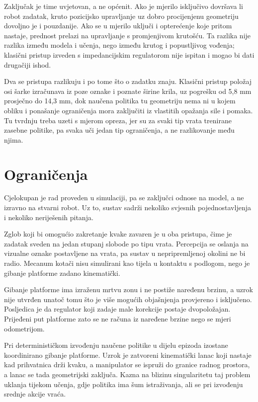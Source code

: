 Zaključak je time uvjetovan, a ne općenit. Ako je mjerilo isključivo dovršava li robot zadatak,
kruto pozicijsko upravljanje uz dobro procijenjenu geometriju dovoljno je i pouzdanije. Ako se u
mjerilo uključi i opterećenje koje pritom nastaje, prednost prelazi na upravljanje s promjenjivom
krutošću. Ta razlika nije razlika između modela i učenja, nego između krutog i popustljivog
vođenja; klasični pristup izveden s impedancijskim regulatorom nije ispitan i mogao bi dati
drugačiji ishod.

Dva se pristupa razlikuju i po tome što o zadatku znaju. Klasični pristup položaj osi šarke
izračunava iz poze oznake i poznate širine krila, uz pogrešku od 5,8 mm prosječno do 14,3 mm,
dok naučena politika tu geometriju nema ni u kojem obliku i ponašanje ograničenja mora zaključiti
iz vlastitih opažanja sile i pomaka. Tu tvrdnju treba uzeti s mjerom opreza, jer su za svaki tip
vrata trenirane zasebne politike, pa svaka uči jedan tip ograničenja, a ne razlikovanje među njima.

\section{Ograničenja}

Cjelokupan je rad proveden u simulaciji, pa se zaključci odnose na model, a ne izravno na stvarni
robot. Uz to, sustav sadrži nekoliko svjesnih pojednostavljenja i nekoliko neriješenih pitanja.

Zglob koji bi omogućio zakretanje kvake zavaren je u oba pristupa, čime je zadatak sveden na
jedan stupanj slobode po tipu vrata. Percepcija se oslanja na vizualne oznake postavljene na
vrata, pa sustav u nepripremljenoj okolini ne bi radio. Mecanum kotači nisu simulirani kao tijela
u kontaktu s podlogom, nego je gibanje platforme zadano kinematički.

Gibanje platforme ima izraženu mrtvu zonu i ne postiže naređenu brzinu, a uzrok nije utvrđen
unatoč tomu što je više mogućih objašnjenja provjereno i isključeno. Posljedica je da regulator
koji zadaje male korekcije postaje dvopoložajan. Prijeđeni put platforme zato se ne računa iz
naređene brzine nego se mjeri odometrijom.

Pri determinističkom izvođenju naučene politike u dijelu epizoda izostane koordinirano gibanje
platforme. Uzrok je zatvoreni kinematički lanac koji nastaje kad prihvatnica drži kvaku, a
manipulator se ispruži do granice radnog prostora, a lanac se tada geometrijski zaključa. Kazna na
blizinu singularitetu taj problem uklanja tijekom učenja, gdje politika ima šum istraživanja, ali
se pri izvođenju srednje akcije vraća.

